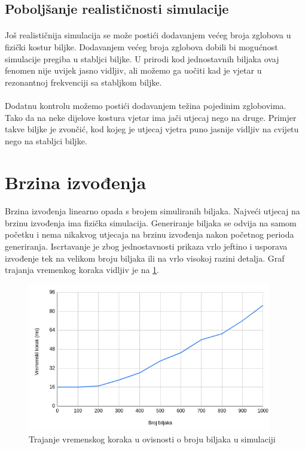 \documentclass[times, utf8, diplomski]{fer}
\begin{document}
\subsection{Poboljšanje realističnosti simulacije}
\paragraph{}
Još realističnija simulacija se može postići dodavanjem većeg broja zglobova u
fizički kostur biljke. Dodavanjem većeg broja zglobova dobili bi mogućnost 
simulacije pregiba u stabljci biljke. U prirodi kod jednostavnih biljaka ovaj 
fenomen nije uvijek jasno vidljiv, ali možemo ga uočiti kad je vjetar u 
rezonantnoj frekvenciji sa stabljkom biljke.
\paragraph{}
Dodatnu kontrolu možemo postići dodavanjem težina pojedinim zglobovima. Tako da 
na neke dijelove kostura vjetar ima jači utjecaj nego na druge. Primjer takve 
biljke je zvončić, kod kojeg je utjecaj vjetra puno jasnije vidljiv na cvijetu 
nego na stabljci biljke.

\section{Brzina izvođenja}
\paragraph{}
Brzina izvođenja linearno opada s brojem simuliranih biljaka. Najveći utjecaj na 
brzinu izvođenja ima fizička simulacija. Generiranje biljaka se odvija na samom 
početku i nema nikakvog utjecaja na brzinu izvođenja nakon početnog perioda 
generiranja. Iscrtavanje je zbog jednostavnosti prikaza vrlo jeftino i usporava
izvođenje tek na velikom broju biljaka ili na vrlo visokoj razini detalja. Graf trajanja vremenkog koraka vidljiv je na \ref{fig:53-1}.
\begin{figure}[h]
	\centering
	\includegraphics[width=0.95\textwidth]{img/53-1}
	\caption{Trajanje vremenskog koraka u ovisnosti o broju biljaka u simulaciji}
	\label{fig:53-1}
\end{figure}
\end{document}
